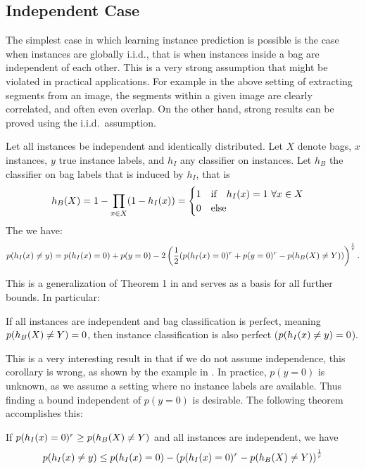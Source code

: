 \subsection{Independent Case}
The simplest case in which learning instance prediction is possible is the case
when instances are globally i.i.d., that is when instances inside a bag are
independent of each other. This is a very strong assumption that might be
violated in practical applications. For example in the above setting of extracting
segments from an image, the segments within a given image are clearly correlated,
and often even overlap.
On the other hand, strong results can be proved using the i.i.d.\ assumption.

\begin{theorem}\label{basicthm}
Let all instances be independent and identically distributed. Let $X$ denote bags, $x$ instances, $y$ true instance labels, and $h_I$ any classifier
on instances. Let $h_B$ the classifier on bag labels that is induced by $h_I$, that is
\[
    h_B(X) = 1 - \prod_{x \in X} (1 - h_I(x)) =
    \begin{cases}
        1 \text{\quad if\quad} h_I(x) = 1\ \forall x \in X\\
        0 \text{\quad else}
    \end{cases}
\]
The we have:
\begin{align*}
   p(h_I(x) \neq y) = p(h_I(x)=0) + p(y=0) - 2 \left (\frac{1}{2} ( p(h_I(x)=0)^r + p(y=0)^r - p(h_B(X) \neq Y)) \right)^\frac{1}{r}.
\end{align*}
\end{theorem}
This is a generalization of Theorem 1 in \citet{sabato2010reducing} and serves as a basis for all further bounds. 
In particular:

\begin{corollary}\label{perfect}
If all instances are independent and bag classification is perfect, meaning $p(h_B(X) \neq Y)=0$, then instance classification is also perfect ($p(h_I(x) \neq y) =0$).
\end{corollary}
This is a very interesting result in that if we do not assume independence, this corollary is wrong,
as shown by the example in .
%
In practice, $p(y=0)$ is unknown, as we assume a setting where no instance labels are available.
Thus finding a bound independent of $p(y=0)$ is desirable. The following theorem accomplishes this:

\begin{theorem}\label{iidbound}
If $p(h_I(x)=0)^r  \geq p(h_B(X) \neq Y)$ and all instances are independent, we have
\begin{align}
    p(h_I(x)\neq y) \leq p(h_I(x)=0) - \left ( p(h_I(x)=0)^r - p(h_B(X) \neq Y) \right ) ^ \frac{1}{r}
\end{align}
\end{theorem}

